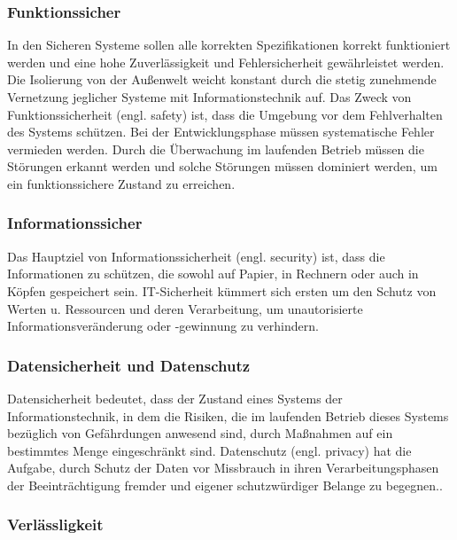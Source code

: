 \subsubsection{Funktionssicher}

In den Sicheren Systeme sollen alle korrekten Spezifikationen korrekt funktioniert werden und eine hohe Zuverlässigkeit und Fehlersicherheit gewährleistet werden. Die Isolierung von der Außenwelt weicht konstant durch die stetig zunehmende Vernetzung jeglicher Systeme mit Informationstechnik auf. Das Zweck von Funktionssicherheit (engl. safety) ist, dass die Umgebung vor dem Fehlverhalten des Systems schützen.  Bei der Entwicklungsphase müssen systematische Fehler vermieden werden. Durch die Überwachung im laufenden Betrieb müssen die Störungen erkannt werden und solche Störungen müssen dominiert werden, um ein funktionssichere Zustand zu erreichen\cite{hoepner2014trends}.

\subsubsection{Informationssicher}

Das Hauptziel von Informationssicherheit (engl. security) ist, dass die Informationen zu schützen, die sowohl auf Papier, in Rechnern oder auch in Köpfen gespeichert sein. IT-Sicherheit kümmert sich ersten um den Schutz von Werten u. Ressourcen und deren Verarbeitung\cite[81]{int11sicher}, um unautorisierte Informationsveränderung oder -gewinnung zu verhindern\cite[26]{eckert2013sicherheit}.

\subsubsection{Datensicherheit und Datenschutz}

Datensicherheit bedeutet, dass der Zustand eines Systems der Informationstechnik, in dem die Risiken, die im laufenden Betrieb dieses Systems bezüglich von Gefährdungen anwesend sind, durch Maßnahmen auf ein bestimmtes Menge eingeschränkt sind. Datenschutz (engl. privacy) hat die Aufgabe, durch Schutz der Daten vor Missbrauch in ihren Verarbeitungsphasen der Beeinträchtigung fremder und eigener schutzwürdiger Belange zu begegnen.\cite[14--15]{eberspacher1994sichere}.

\subsubsection{Verlässligkeit}


